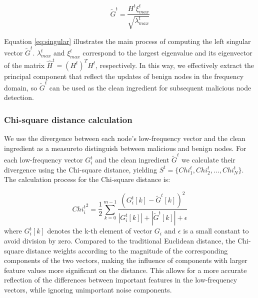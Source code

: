 \documentclass[lettersize,journal]{IEEEtran}
\begin{document}
\begin{equation}
\tilde{G}^t = \frac{H^t \xi^t_{max}}{\sqrt{\lambda^t_{max}}}
\label{eq:singular}
\end{equation}


Equation \ref{eq:singular} illustrates the main process of computing the left singular vector $\tilde{G}^t$. $\lambda^t_{max}$ and $\xi^t_{max}$ correspond to the largest eigenvalue and its eigenvector of the matrix $\hat{H}^t = (H^t)^{T} H^t$, respectively. In this way, we effectively extract the principal component that reflect the updates of benign nodes in the frequency domain, so $\tilde{G}^t$ can be used as the clean ingredient for subsequent malicious node detection.

\subsubsection{Chi-square distance calculation}
We use the divergence between each node's low-frequency vector and the clean ingredient as a measureto distinguish between malicious and benign nodes. For each  low-frequency vector \(G_i^t\) and the clean ingredient \(\tilde{G}^t\) we calculate their divergence using the Chi-square distance, yielding \(S^t = \{Chi^t_1, Chi^t_2, \ldots, Chi^t_N\}\). The calculation process for the Chi-square distance is:

\begin{equation}
{Chi^t_i}^2 = \frac{1}{2} \sum_{k=0}^{m-1}\frac{(G_i^t[k] - {\tilde G}^t[k])^2}{|G_i^t[k]|+|{\tilde G}^t[k]| + \epsilon}
\label{equation:KL}
\end{equation}
where \(G_i^t[k]\) denotes the k-th element of vector \(G_i\) and \(\epsilon\) is a small constant to avoid division by zero. Compared to the traditional Euclidean distance, the Chi-square distance weights according to the magnitude of the corresponding components of the two vectors, making the influence of components with larger feature values more significant on the distance. This allows for a more accurate reflection of the differences between important features in the low-frequency vectors, while ignoring unimportant noise components.
\end{document}
